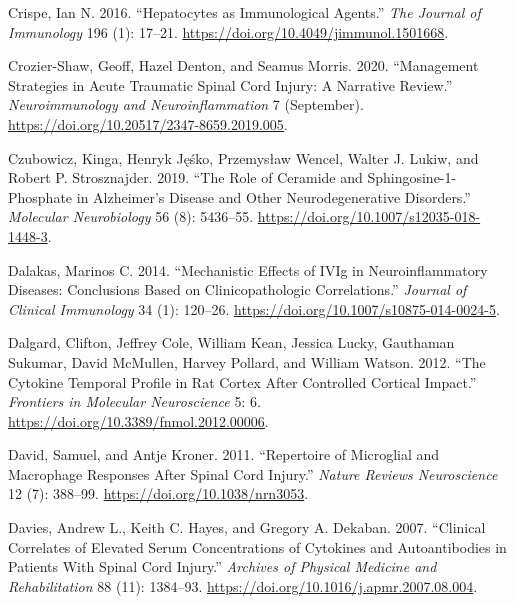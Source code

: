 \documentclass[9pt,lineno]{elife}
\newlength{\cslhangindent}
\newlength{\cslentryspacingunit} %
\newenvironment{CSLReferences}[2] %
 {%
  \setlength{\parindent}{0pt}
  \ifodd #1
  \let\oldpar\par
  \def\par{\hangindent=\cslhangindent\oldpar}
  \fi
  \setlength{\parskip}{#2\cslentryspacingunit}
 }%
 {}
\begin{document}
\begin{CSLReferences}{1}{0}
\leavevmode{}%
Crispe, Ian N. 2016. {``Hepatocytes as {Immunological Agents}.''} \emph{The Journal of Immunology} 196 (1): 17--21. \url{https://doi.org/10.4049/jimmunol.1501668}.

\leavevmode{}%
Crozier-Shaw, Geoff, Hazel Denton, and Seamus Morris. 2020. {``Management Strategies in Acute Traumatic Spinal Cord Injury: A Narrative Review.''} \emph{Neuroimmunology and Neuroinflammation} 7 (September). \url{https://doi.org/10.20517/2347-8659.2019.005}.

\leavevmode{}%
Czubowicz, Kinga, Henryk Jęśko, Przemysław Wencel, Walter J. Lukiw, and Robert P. Strosznajder. 2019. {``The {Role} of {Ceramide} and {Sphingosine-1-Phosphate} in {Alzheimer}'s {Disease} and {Other Neurodegenerative Disorders}.''} \emph{Molecular Neurobiology} 56 (8): 5436--55. \url{https://doi.org/10.1007/s12035-018-1448-3}.

\leavevmode{}%
Dalakas, Marinos C. 2014. {``Mechanistic {Effects} of {IVIg} in {Neuroinflammatory Diseases}: {Conclusions Based} on {Clinicopathologic Correlations}.''} \emph{Journal of Clinical Immunology} 34 (1): 120--26. \url{https://doi.org/10.1007/s10875-014-0024-5}.

\leavevmode{}%
Dalgard, Clifton, Jeffrey Cole, William Kean, Jessica Lucky, Gauthaman Sukumar, David McMullen, Harvey Pollard, and William Watson. 2012. {``The Cytokine Temporal Profile in Rat Cortex After Controlled Cortical Impact.''} \emph{Frontiers in Molecular Neuroscience} 5: 6. \url{https://doi.org/10.3389/fnmol.2012.00006}.

\leavevmode{}%
David, Samuel, and Antje Kroner. 2011. {``Repertoire of Microglial and Macrophage Responses After Spinal Cord Injury.''} \emph{Nature Reviews Neuroscience} 12 (7): 388--99. \url{https://doi.org/10.1038/nrn3053}.

\leavevmode{}%
Davies, Andrew L., Keith C. Hayes, and Gregory A. Dekaban. 2007. {``Clinical {Correlates} of {Elevated Serum Concentrations} of {Cytokines} and {Autoantibodies} in {Patients With Spinal Cord Injury}.''} \emph{Archives of Physical Medicine and Rehabilitation} 88 (11): 1384--93. \url{https://doi.org/10.1016/j.apmr.2007.08.004}.


\end{CSLReferences}
\end{document}
